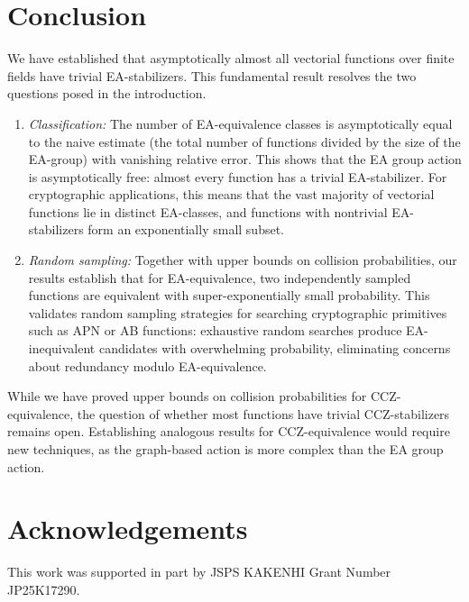\documentclass[11pt]{article}
\theoremstyle{definition}
\begin{document}
\section{Conclusion}\label{sec:conclusion}

We have established that asymptotically almost all vectorial functions over finite fields
have trivial EA-stabilizers. This fundamental result resolves the two questions posed in the
introduction.

\begin{enumerate}
\item \emph{Classification:} The number of EA-equivalence classes is asymptotically
equal to the naive estimate (the total number of functions divided by the size of the
EA-group) with vanishing relative error. This shows that the EA group action is asymptotically
free: almost every function has a trivial EA-stabilizer. For cryptographic applications, this
means that the vast majority of vectorial functions lie in distinct EA-classes, and functions
with nontrivial EA-stabilizers form an exponentially small subset.

\item \emph{Random sampling:} Together with upper bounds on collision probabilities,
our results establish that for EA-equivalence, two independently sampled functions are equivalent
with super-exponentially small probability. This validates random sampling strategies for
searching cryptographic primitives such as APN or AB functions: exhaustive random searches
produce EA-inequivalent candidates with overwhelming probability, eliminating concerns about
redundancy modulo EA-equivalence.
\end{enumerate}

While we have proved upper bounds on collision probabilities for CCZ-equivalence, the question
of whether most functions have trivial CCZ-stabilizers remains open. Establishing analogous results for CCZ-equivalence would require new techniques, as the
graph-based action is more complex than the EA group action.

\section*{Acknowledgements}

This work was supported in part by JSPS KAKENHI Grant Number JP25K17290.



\end{document}
